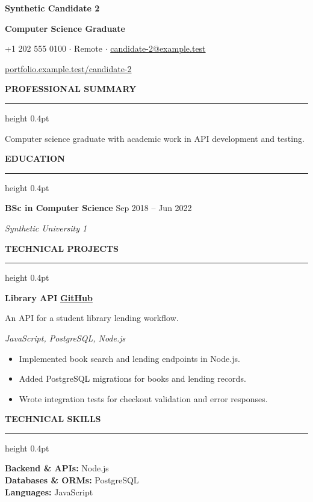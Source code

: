 \documentclass[10pt,a4paper]{article}
\newcommand{\atsHeaderToSection}{13pt}
\newcommand{\atsSectionToSection}{15pt}
\newcommand{\atsHeadingToContent}{5pt}
\newcommand{\atsProjectTitleToTech}{2.3pt}
\newcommand{\atsProjectTechToBullets}{3.7pt}
\newcommand{\atsRoleToMetadata}{1.5pt}
\newcommand{\atsBulletToBullet}{2.2pt}
\newcommand{\atssection}[1]{%
  \vspace{\atsSectionToSection}%
  {\noindent\large\bfseries\uppercase{#1}}\par
  \vspace{1.5pt}\hrule height 0.4pt\vspace{\atsHeadingToContent}%
}
\newcommand{\atsfirstsection}[1]{%
  \vspace{\atsHeaderToSection}%
  {\noindent\large\bfseries\uppercase{#1}}\par
  \vspace{1.5pt}\hrule height 0.4pt\vspace{\atsHeadingToContent}%
}
\begin{document}
{\centering
  {\Huge \textbf{Synthetic Candidate 2}}\par
  \vspace{3pt}
  {\large \textbf{Computer Science Graduate}}\par
  \vspace{3pt}
  {\small +1 202 555 0100 $\cdot$ Remote $\cdot$ \href{mailto:candidate-2@example.test}{candidate-2@example.test}}\par
  \vspace{2pt}
  {\small \href{https://portfolio.example.test/candidate-2}{portfolio.example.test/candidate-2}}\par
}

\atsfirstsection{Professional Summary}
Computer science graduate with academic work in API development and testing.\par

\atssection{Education}
\textbf{BSc in Computer Science} \hfill Sep 2018 -- Jun 2022\par
\vspace{\atsRoleToMetadata}
{\small\textit{Synthetic University 1}}\par

\atssection{Technical Projects}
\textbf{Library API} \hfill {\small \href{https://github.com/synthetic-fixture/project-1}{\textbf{GitHub}}}\par
An API for a student library lending workflow.\par
\vspace{\atsProjectTitleToTech}
{\textit{JavaScript, PostgreSQL, Node.js}}\par
\vspace{\atsProjectTechToBullets}
\begin{itemize}
\setlength{\itemsep}{\atsBulletToBullet}\setlength{\parskip}{0pt}\setlength{\parsep}{0pt}\setlength{\topsep}{0pt}\setlength{\partopsep}{0pt}
  \item Implemented book search and lending endpoints in Node.js.
  \item Added PostgreSQL migrations for books and lending records.
  \item Wrote integration tests for checkout validation and error responses.
\end{itemize}

\atssection{Technical Skills}
\textbf{Backend \& APIs:} Node.js\\
\textbf{Databases \& ORMs:} PostgreSQL\\
\textbf{Languages:} JavaScript\par
\end{document}
